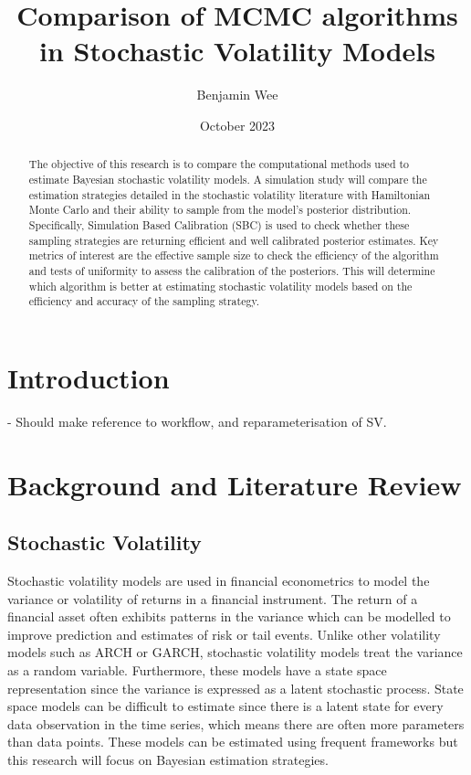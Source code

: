 \documentclass[12pt, a4paper]{article}
\title{Comparison of MCMC algorithms in Stochastic Volatility Models}
\author{Benjamin Wee}
\date{October 2023}
\begin{document}
\maketitle 

\begin{abstract}
    The objective of this research is to compare the computational methods used to estimate Bayesian stochastic volatility models. A simulation study will compare the estimation strategies detailed in the stochastic volatility literature with Hamiltonian Monte Carlo and their ability to sample from the model's posterior distribution. Specifically, Simulation Based Calibration (SBC) is used to check whether these sampling strategies are returning efficient and well calibrated posterior estimates. Key metrics of interest are the effective sample size to check the efficiency of the algorithm and tests of uniformity to assess the calibration of the posteriors. This will determine which algorithm is better at estimating stochastic volatility models based on the efficiency and accuracy of the sampling strategy.
\end{abstract}

\newpage

\tableofcontents{\protect\newpage}

\section{Introduction}

- Should make reference to workflow, and reparameterisation of SV.

\section{Background and Literature Review}

    \subsection{Stochastic Volatility}
        Stochastic volatility models are used in financial econometrics to model the variance or volatility of returns in a financial instrument. The return of a financial asset often exhibits patterns in the variance which can be modelled to improve prediction and estimates of risk or tail events. Unlike other volatility models such as ARCH or GARCH, stochastic volatility models treat the variance as a random variable. Furthermore, these models have a state space representation since the variance is expressed as a latent stochastic process. State space models can be difficult to estimate since there is a latent state for every data observation in the time series, which means there are often more parameters than data points. These models can be estimated using frequent frameworks but this research will focus on Bayesian estimation strategies.
\end{document}
